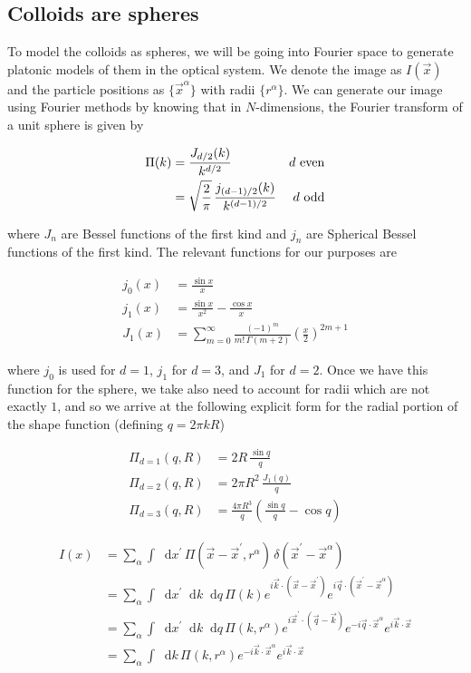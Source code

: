 \documentclass[preprint,amsmath,amssymb]{revtex4}
\newcommand*\diff{\mathop{}\!\mathrm{d}}
\begin{document}
\subsection{Colloids are spheres}

To model the colloids as spheres, we will be going into Fourier space to
generate platonic models of them in the optical system.  We denote the image as
$I(\vec{x})$ and the particle positions as $\{\vec{x}^{\alpha}\}$ with radii
$\{r^{\alpha}\}$.  We can generate our image using Fourier methods by knowing that
in $N$-dimensions, the Fourier transform of a unit sphere is given by

\begin{align*}
    \Pi(k) &= \frac{J_{d/2}(k)}{k^{d/2}} & d\,\,\rm{even} \\
           &= \sqrt{\frac{2}{\pi}}\, \frac{j_{(d-1)/2}(k)}{k^{(d-1)/2}} &d\,\,\rm{odd}
\end{align*}

where $J_n$ are Bessel functions of the first kind and $j_n$ are Spherical
Bessel functions of the first kind.  The relevant functions for our purposes
are

\begin{align*}
    j_0(x) &= \frac{\sin{x}}{x} \\
    j_1(x) &= \frac{\sin{x}}{x^2} - \frac{\cos{x}}{x} \\
    J_1(x) &= \sum_{m=0}^{\infty} \frac{(-1)^m}{m!\,\Gamma(m+2)} \left(\frac{x}{2}\right)^{2m+1}
\end{align*}

where $j_0$ is used for $d=1$, $j_1$ for $d=3$, and $J_1$ for $d=2$.  Once we
have this function for the sphere, we take also need to account for radii which
are not exactly $1$, and so we arrive at the following explicit form for the
radial portion of the shape function (defining $q = 2\pi k R$)

\begin{align*}
    \Pi_{d=1}(q,R) &= 2 R \,\frac{\sin{q}}{q} \\
    \Pi_{d=2}(q,R) &= 2 \pi R^2 \,\frac{J_1(q)} {q} \\
    \Pi_{d=3}(q,R) &= \frac{4\pi R^3}{q}\left(\frac{\sin{q}}{q} -\cos{q}\right) 
\end{align*}

\begin{align*}
    I(x) &= \sum_{\alpha} \int \diff x^{\prime}\, \Pi(\vec{x} - \vec{x}^{\prime}, r^{\alpha}) \,\delta(\vec{x}^{\prime} - \vec{x}^{\alpha}) \\
         &= \sum_{\alpha} \int \diff x^{\prime} \diff k \diff q\, \Pi(k) e^{i \vec{k} \cdot ( \vec{x} - \vec{x}^{\prime})} e^{i \vec{q} \cdot (\vec{x}^{\prime} - \vec{x}^{\alpha})} \\
         &= \sum_{\alpha} \int \diff x^{\prime} \diff k \diff q\, \Pi(k, r^{\alpha}) e^{i \vec{x}^{\prime} \cdot ( \vec{q} - \vec{k})} e^{- i \vec{q} \cdot \vec{x}^{\alpha}} e^{i \vec{k} \cdot \vec{x}} \\
         &= \sum_{\alpha} \int \diff k\, \Pi(k, r^{\alpha}) e^{ - i \vec{k} \cdot \vec{x}^{\alpha}} e^{ i \vec{k} \cdot \vec{x}}
\end{align*}
\end{document}
